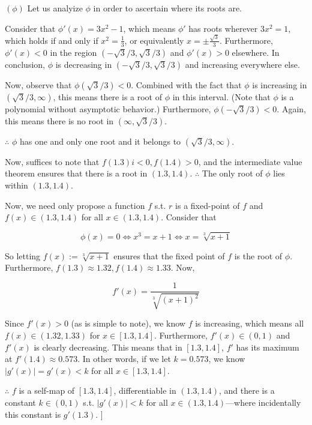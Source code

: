 \documentclass[12pt]{article}
\theoremstyle{definition}
\begin{document}
$(\phi)$ Let us analyize $\phi$ in order to
ascertain where its roots are. 

Consider that $\phi'(x) = 3x^2 - 1$, which means $\phi'$ has roots wherever
$3x^2 = 1$, which holds if and only if $x^2 = \frac{1}{3}$, or equivalently $x =
\pm \frac{\sqrt{3} }{3} $. Furthermore, $\phi'(x) < 0$ in the region $(-\sqrt{3}
/ 3, \sqrt{3}/3)  $ and $\phi'(x) > 0$ elsewhere. In conclusion, $\phi$ is
decreasing in $(-\sqrt{3} / 3, \sqrt{3} / 3)  $ and increasing everywhere else.

Now, observe that $\phi\left( \sqrt{3}/3  \right) < 0$. Combined with the fact
that $\phi$ is increasing in $(\sqrt{3} / 3, \infty)$, this means there is a
root of $\phi$ in this interval. (Note that $\phi$ is a polynomial without
asymptotic behavior.) Furthermore, $\phi \left( -\sqrt{3} / 3 \right)  < 0$. Again, this means there
is no root in $(\infty, \sqrt{3}  /3) $. 

$\therefore $ $\phi$ has one and only one root and it belongs to $(\sqrt{3} / 3,
\infty) $.

Now, suffices to note that $f(1.3)i < 0, f(1.4) > 0$, and the intermediate value
theorem ensures that there is a root in $(1.3, 1.4)$. $\therefore $ The only
root of $\phi$ lies within $(1.3, 1.4)$.

Now, we need only propose a function $f$ s.t. $r$ is a fixed-point of $f$ and 
$f(x) \in (1.3, 1.4)$ for all $x \in (1.3, 1.4)$. Consider that 

\begin{equation}
    \phi(x) = 0 \iff x^3 = x + 1 \iff x = \sqrt[3]{x+1} 
\end{equation}

So letting $f(x) := \sqrt[3]{x+1} $ ensures that the fixed point of $f$ is the
root of $\phi$. Furthermore, $f(1.3) \approx 1.32, f(1.4) \approx 1.33$. Now, 

\begin{equation*}
    f'(x) = \frac{1}{\sqrt[3]{(x+1)^2} }
\end{equation*}

Since $f'(x) > 0$ (as is simple to note), we know $f$ is increasing, which means
all $f(x) \in (1.32, 1.33)$ for $x \in [1.3, 1.4]$. Furthermore, 
$f'(x) \in (0, 1)$ and $f'(x)$ is clearly decreasing. This means that in $[1.3,
1.4]$, $f'$ has its maximum at $f'(1.4) \approx 0.573$. In other words, if we
let $k = 0.573$, we know $|g'(x)| = g'(x) < k$ for all $x \in [1.3, 1.4]$.

$\therefore $ $f$ is a self-map of $[1.3, 1.4]$, differentiable in $(1.3, 1.4)$,
and there is a constant $k \in (0, 1)$ s.t. $|g'(x)| < k$ for all $x \in (1.3,
1.4)$---where incidentally this constant is $g'(1.3)$. ]
\end{document}
